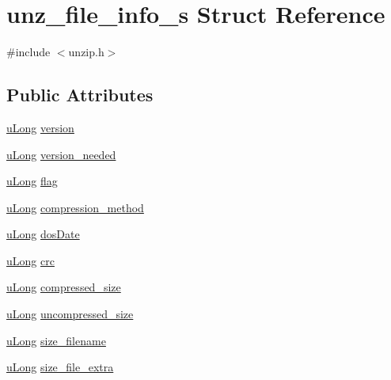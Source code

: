 \hypertarget{structunz__file__info__s}{\section{unz\-\_\-file\-\_\-info\-\_\-s Struct Reference}
\label{structunz__file__info__s}
}


{\ttfamily \#include $<$unzip.\-h$>$}

\subsection*{Public Attributes}
\begin{DoxyCompactItemize}
\item 
\hyperlink{zconf_8h_a154b3b80120c903a368fec5f11f3007a}{u\-Long} \hyperlink{structunz__file__info__s_a635f933b26b636d8314cef61af62fcef}{version}
\item 
\hyperlink{zconf_8h_a154b3b80120c903a368fec5f11f3007a}{u\-Long} \hyperlink{structunz__file__info__s_a1578aca2bb7fed658f9f94c78d00288e}{version\-\_\-needed}
\item 
\hyperlink{zconf_8h_a154b3b80120c903a368fec5f11f3007a}{u\-Long} \hyperlink{structunz__file__info__s_adff7171a3114d55e5532c593b1779ecc}{flag}
\item 
\hyperlink{zconf_8h_a154b3b80120c903a368fec5f11f3007a}{u\-Long} \hyperlink{structunz__file__info__s_aaaca88f0ebec5c1cfebb436b8e70a774}{compression\-\_\-method}
\item 
\hyperlink{zconf_8h_a154b3b80120c903a368fec5f11f3007a}{u\-Long} \hyperlink{structunz__file__info__s_a14bd7da84cada0f4b1455d60274eef91}{dos\-Date}
\item 
\hyperlink{zconf_8h_a154b3b80120c903a368fec5f11f3007a}{u\-Long} \hyperlink{structunz__file__info__s_a6d741cb2df07794d7a4794841148893b}{crc}
\item 
\hyperlink{zconf_8h_a154b3b80120c903a368fec5f11f3007a}{u\-Long} \hyperlink{structunz__file__info__s_a35ee9d733879c87565e40a545fe46fb6}{compressed\-\_\-size}
\item 
\hyperlink{zconf_8h_a154b3b80120c903a368fec5f11f3007a}{u\-Long} \hyperlink{structunz__file__info__s_a7696a98511bc57e389485e5313a9c2bf}{uncompressed\-\_\-size}
\item 
\hyperlink{zconf_8h_a154b3b80120c903a368fec5f11f3007a}{u\-Long} \hyperlink{structunz__file__info__s_ae4f2f81a5301f7df9014838a56a496c6}{size\-\_\-filename}
\item 
\hyperlink{zconf_8h_a154b3b80120c903a368fec5f11f3007a}{u\-Long} \hyperlink{structunz__file__info__s_a479402dcb3555c922e3ce87c8f967990}{size\-\_\-file\-\_\-extra}

\end{DoxyCompactItemize}
